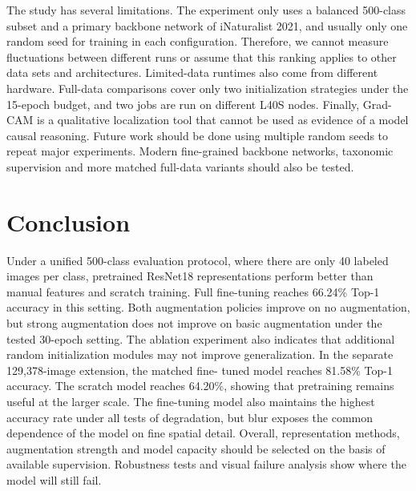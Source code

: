 The study has several limitations. The experiment only uses a balanced
500-class subset and a primary backbone network of iNaturalist 2021, and
usually only one random seed for training in each configuration. Therefore, we
cannot measure fluctuations between different runs or assume that this ranking
applies to other data sets and architectures. Limited-data runtimes also come
from different hardware. Full-data comparisons cover only two initialization
strategies under the 15-epoch budget, and two jobs are run on different L40S
nodes. Finally, Grad-CAM is a qualitative localization tool that cannot be
used as evidence of a model causal reasoning. Future work should be done using
multiple random seeds to repeat major experiments. Modern fine-grained
backbone networks, taxonomic supervision and more matched full-data variants
should also be tested.

\section{Conclusion}
\label{sec:conclusion}

Under a unified 500-class evaluation protocol, where there are only 40 labeled
images per class, pretrained ResNet18 representations perform better than
manual features and scratch training. Full fine-tuning reaches 66.24\% Top-1
accuracy in this setting. Both augmentation policies improve on no
augmentation, but strong augmentation does not improve on basic augmentation
under the tested 30-epoch setting. The ablation experiment also indicates that
additional random initialization modules may not improve generalization. In the separate 129,378-image extension, the matched fine-
tuned model reaches 81.58\% Top-1 accuracy. The scratch model reaches 64.20\%,
showing that pretraining remains useful at the larger scale. The fine-tuning
model also maintains the highest accuracy rate under all tests of degradation,
but blur exposes the common dependence of the model on fine spatial detail.
Overall, representation methods, augmentation strength and model capacity
should be selected on the basis of available supervision. Robustness tests and
visual failure analysis show where the model will still fail.
